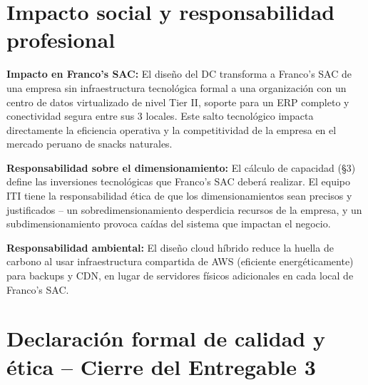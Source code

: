 \documentclass[11pt, a4paper, oneside]{report}
\begin{document}
\section{Impacto social y responsabilidad profesional}

\textbf{Impacto en Franco's SAC:} El diseño del DC transforma a Franco's SAC de una empresa sin infraestructura tecnológica formal a una organización con un centro de datos virtualizado de nivel Tier II, soporte para un ERP completo y conectividad segura entre sus 3 locales. Este salto tecnológico impacta directamente la eficiencia operativa y la competitividad de la empresa en el mercado peruano de snacks naturales.

\textbf{Responsabilidad sobre el dimensionamiento:} El cálculo de capacidad (§3) define las inversiones tecnológicas que Franco's SAC deberá realizar. El equipo ITI tiene la responsabilidad ética de que los dimensionamientos sean precisos y justificados -- un sobredimensionamiento desperdicia recursos de la empresa, y un subdimensionamiento provoca caídas del sistema que impactan el negocio.

\textbf{Responsabilidad ambiental:} El diseño cloud híbrido reduce la huella de carbono al usar infraestructura compartida de AWS (eficiente energéticamente) para backups y CDN, en lugar de servidores físicos adicionales en cada local de Franco's SAC.

\section{Declaración formal de calidad y ética -- Cierre del Entregable 3}
\end{document}
